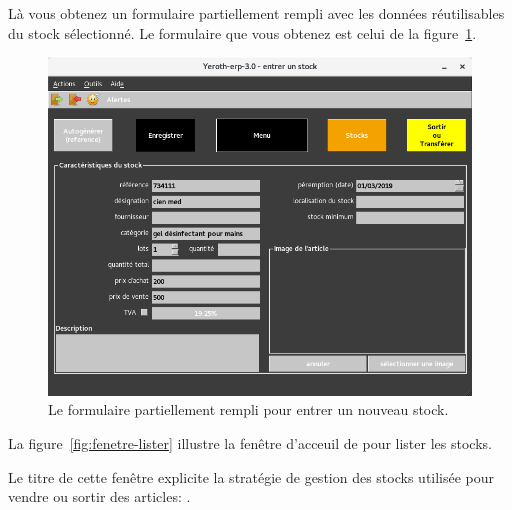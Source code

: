 \begin{itemize}
		L\`a vous obtenez un formulaire partiellement rempli
	    avec les donn\'ees r\'eutilisables du stock s\'electionn\'e.
	    Le formulaire que vous obtenez est celui de la
	    figure~\ref{fig:formulaire-entrer-2}.\\
	    
	    \begin{figure}[!htbp]
		\centering
		\includegraphics[scale=0.63]{images/yeren-fenetre-entrer-2.png}
		\caption{Le formulaire partiellement rempli pour entrer un nouveau stock.}
		\label{fig:formulaire-entrer-2}
		\end{figure}
\end{itemize}

\newpage



La figure~\ref{fig:fenetre-lister} illustre la fen\^etre
d'acceuil de \yeren pour lister les stocks.

Le titre de cette fen\^etre explicite la strat\'egie
de gestion des stocks utilis\'ee pour vendre ou
sortir des articles: \dpfdpo.\\


